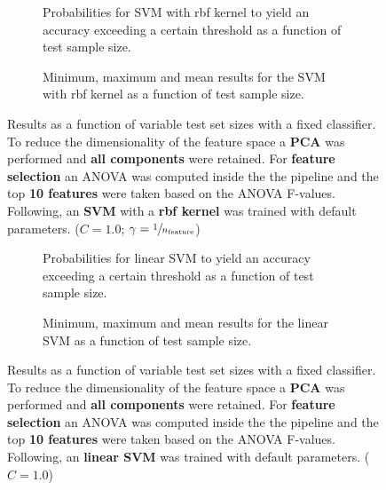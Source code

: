 \begin{figure}
    \captionsetup[subfigure]{justification=justified,singlelinecheck=false}
    \begin{subfigure}[t]{0.61\textwidth}
        
        \caption{Probabilities for SVM with rbf kernel to yield an accuracy exceeding a certain threshold as a function of test sample size.}
    \end{subfigure}
    \hspace{3.0mm}
    \begin{subfigure}[t]{0.34\textwidth}
        
        \caption{Minimum, maximum and mean results for the SVM with rbf kernel as a function of test sample size.}
    \end{subfigure}
    \caption[Effects of varying test sample size. SVM (kernel = rbf); Preprocessing: PCA ($n_\text{components} = \text{all}$); ANOVA feature selection ($k_\text{best} = \num{10}$)]{Results as a function of variable test set sizes with a fixed classifier. To reduce the dimensionality of the feature space a \textbf{PCA} was performed and \textbf{all components} were retained. For \textbf{feature selection} an ANOVA was computed inside the the pipeline and the top \textbf{\num{10} features} were taken based on the ANOVA F-values. Following, an \textbf{{SVM}} with a \textbf{{rbf kernel}} was trained with default parameters. ($C=\num{1.0}$; $\gamma=\sfrac{1}{n_\text{feature}}$)}
    \label{fig:PCA_all_components_10_best_selected_SVC}
\end{figure}

\begin{figure}
    \captionsetup[subfigure]{justification=justified,singlelinecheck=false}
    \begin{subfigure}[t]{0.61\textwidth}
        
        \caption{Probabilities for linear SVM to yield an accuracy exceeding a certain threshold as a function of test sample size.}
    \end{subfigure}
    \hspace{3.0mm}
    \begin{subfigure}[t]{0.34\textwidth}
        
        \caption{Minimum, maximum and mean results for the linear SVM as a function of test sample size.}
    \end{subfigure}
    \caption[Effects of varying test sample size. Linear SVM; Preprocessing: PCA ($n_\text{components} = \text{all}$); ANOVA feature selection ($k_\text{best} = \num{10}$)]{Results as a function of variable test set sizes with a fixed classifier. To reduce the dimensionality of the feature space a \textbf{PCA} was performed and \textbf{all components} were retained. For \textbf{feature selection} an ANOVA was computed inside the the pipeline and the top \textbf{\num{10} features} were taken based on the ANOVA F-values. Following, an \textbf{{linear SVM}} was trained with default parameters. ($C=\num{1.0}$)}
    \label{fig:PCA_all_components_10_best_selected_LinearSVC}
\end{figure}

